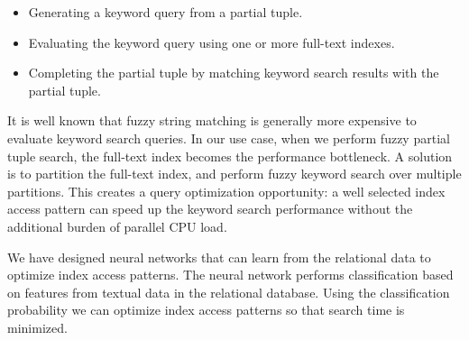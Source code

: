 \begin{itemize}
\item Generating a keyword query from a partial tuple.
\item Evaluating the keyword query using one or more full-text indexes.
\item Completing the partial tuple by matching keyword search results with the partial tuple.
\end{itemize}

It is well known that fuzzy string matching is generally more expensive to evaluate keyword search queries.  In our use case, when we perform fuzzy partial tuple search, the full-text index becomes the performance bottleneck.  A solution is to partition the full-text index, and perform fuzzy keyword search over multiple partitions.  This creates a query optimization opportunity: a well selected index access pattern can speed up the keyword search performance without the additional burden of parallel CPU load.

We have designed neural networks that can learn from the relational data to optimize index access patterns.  The neural network performs classification based on features from textual data in the relational database.  Using the classification probability we can optimize index access patterns so that search time is minimized.


